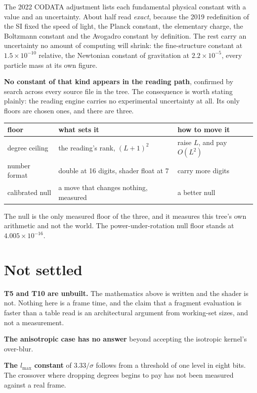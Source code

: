 The 2022 CODATA adjustment lists each fundamental physical constant with a value and an uncertainty. About half read \emph{exact}, because the 2019 redefinition of the SI fixed the speed of light, the Planck constant, the elementary charge, the Boltzmann constant and the Avogadro constant by definition. The rest carry an uncertainty no amount of computing will shrink: the fine-structure constant at \(1.5 \times 10^{-10}\) relative, the Newtonian constant of gravitation at \(2.2 \times 10^{-5}\), every particle mass at its own figure.

\textbf{No constant of that kind appears in the reading path}, confirmed by search across every source file in the tree. The consequence is worth stating plainly: the reading engine carries no experimental uncertainty at all. Its only floors are chosen ones, and there are three.

\begin{center}
\begin{tabular}{@{}lll@{}}
\toprule
floor & what sets it & how to move it \\
\midrule
degree ceiling & the reading's rank, \((L+1)^2\) & raise \(L\), and pay \(O(L^2)\) \\
number format & double at 16 digits, shader float at 7 & carry more digits \\
calibrated null & a move that changes nothing, measured & a better null \\
\bottomrule
\end{tabular}
\end{center}

The null is the only measured floor of the three, and it measures this tree's own arithmetic and not the world. The power-under-rotation null floor stands at \(4.005 \times 10^{-16}\).

\section{Not settled}

\textbf{T5 and T10 are unbuilt.} The mathematics above is written and the shader is not. Nothing here is a frame time, and the claim that a fragment evaluation is faster than a table read is an architectural argument from working-set sizes, and not a measurement.

\textbf{The anisotropic case has no answer} beyond accepting the isotropic kernel's over-blur.

\textbf{The \(l_{\max}\) constant} of \(3.33/\sigma\) follows from a threshold of one level in eight bits. The crossover where dropping degrees begins to pay has not been measured against a real frame.

